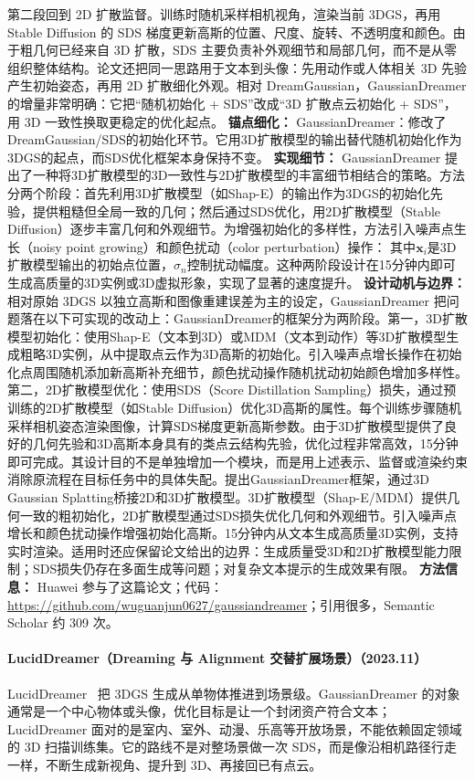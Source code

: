 第二段回到 2D 扩散监督。训练时随机采样相机视角，渲染当前 3DGS，再用 Stable Diffusion 的 SDS 梯度更新高斯的位置、尺度、旋转、不透明度和颜色。由于粗几何已经来自 3D 扩散，SDS 主要负责补外观细节和局部几何，而不是从零组织整体结构。论文还把同一思路用于文本到头像：先用动作或人体相关 3D 先验产生初始姿态，再用 2D 扩散细化外观。相对 DreamGaussian，GaussianDreamer 的增量非常明确：它把“随机初始化 + SDS”改成“3D 扩散点云初始化 + SDS”，用 3D 一致性换取更稳定的优化起点。
\textbf{锚点细化：} GaussianDreamer：修改了DreamGaussian/SDS的初始化环节。它用3D扩散模型的输出替代随机初始化作为3DGS的起点，而SDS优化框架本身保持不变。
\textbf{实现细节：} GaussianDreamer 提出了一种将3D扩散模型的3D一致性与2D扩散模型的丰富细节相结合的策略。方法分两个阶段：首先利用3D扩散模型（如Shap-E）的输出作为3DGS的初始化先验，提供粗糙但全局一致的几何；然后通过SDS优化，用2D扩散模型（Stable Diffusion）逐步丰富几何和外观细节。为增强初始化的多样性，方法引入噪声点生长（noisy point growing）和颜色扰动（color perturbation）操作： 其中$\mathbf{x}_i$是3D扩散模型输出的初始点位置，$\sigma_n$控制扰动幅度。这种两阶段设计在15分钟内即可生成高质量的3D实例或3D虚拟形象，实现了显著的速度提升。
\textbf{设计动机与边界：} 相对原始 3DGS 以独立高斯和图像重建误差为主的设定，GaussianDreamer 把问题落在以下可实现的改动上：GaussianDreamer的框架分为两阶段。第一，3D扩散模型初始化：使用Shap-E（文本到3D）或MDM（文本到动作）等3D扩散模型生成粗略3D实例，从中提取点云作为3D高斯的初始化。引入噪声点增长操作在初始化点周围随机添加新高斯补充细节，颜色扰动操作随机扰动初始颜色增加多样性。第二，2D扩散模型优化：使用SDS（Score Distillation Sampling）损失，通过预训练的2D扩散模型（如Stable Diffusion）优化3D高斯的属性。每个训练步骤随机采样相机姿态渲染图像，计算SDS梯度更新高斯参数。由于3D扩散模型提供了良好的几何先验和3D高斯本身具有的类点云结构先验，优化过程非常高效，15分钟即可完成。其设计目的不是单独增加一个模块，而是用上述表示、监督或渲染约束消除原流程在目标任务中的具体失配。提出GaussianDreamer框架，通过3D Gaussian Splatting桥接2D和3D扩散模型。3D扩散模型（Shap-E/MDM）提供几何一致的粗初始化，2D扩散模型通过SDS损失优化几何和外观细节。引入噪声点增长和颜色扰动操作增强初始化高斯。15分钟内从文本生成高质量3D实例，支持实时渲染。适用时还应保留论文给出的边界：生成质量受3D和2D扩散模型能力限制；SDS损失仍存在多面生成等问题；对复杂文本提示的生成效果有限。
\textbf{方法信息：} Huawei 参与了这篇论文；代码：\url{https://github.com/wuguanjun0627/gaussiandreamer}；引用很多，Semantic Scholar 约 309 次。



\paragraph{LucidDreamer（Dreaming 与 Alignment 交替扩展场景）（2023.11）}
LucidDreamer~\cite{2311_13384} 把 3DGS 生成从单物体推进到场景级。GaussianDreamer 的对象通常是一个中心物体或头像，优化目标是让一个封闭资产符合文本；LucidDreamer 面对的是室内、室外、动漫、乐高等开放场景，不能依赖固定领域的 3D 扫描训练集。它的路线不是对整场景做一次 SDS，而是像沿相机路径行走一样，不断生成新视角、提升到 3D、再接回已有点云。

